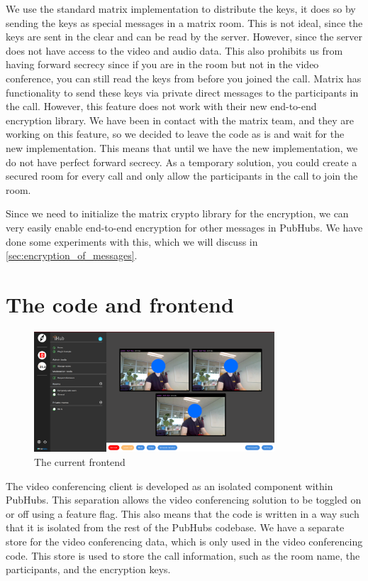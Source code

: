 \documentclass{report}
\begin{document}
We use the standard matrix implementation to distribute the keys, it does so by sending the keys as special
messages in a matrix room. This is not ideal, since the keys are sent in the clear and can be read by the server.
However, since the server does not have access to the video and audio data. This also prohibits us from having
forward secrecy since if you are in the room but not in the video conference, you can still read the keys from
before you joined the call. Matrix has functionality to send these keys via private direct messages to the
participants in the call. However, this feature does not work with their new end-to-end encryption library. We have
been in contact with the matrix team, and they are working on this feature, so we decided to leave the code as is
and wait for the new implementation. This means that until we have the new implementation, we do not have perfect
forward secrecy. As a temporary solution, you could create a secured room for every call and only allow the
participants in the call to join the room.

Since we need to initialize the matrix crypto library for the encryption, we can very easily enable end-to-end
encryption for other messages in PubHubs. We have done some experiments with this, which we will discuss in \autoref{sec:encryption_of_messages}.

\section{The code and frontend}
\begin{figure}[!hbt]
\centering
\includegraphics[width=0.8\textwidth]{img/frontend.png}
\caption{The current frontend}
\label{fig:front-end-setup}
\end{figure}

The video conferencing client is developed as an isolated component within PubHubs. This separation allows the
video conferencing solution to be toggled on or off using a feature flag.
This also means that the code is written in a way such that it is isolated from the rest of the PubHubs codebase.
We have a separate store for the video conferencing data, which is only used in the video conferencing code.
This store is used to store the call information, such as the room name, the participants, and the encryption keys.
\end{document}
